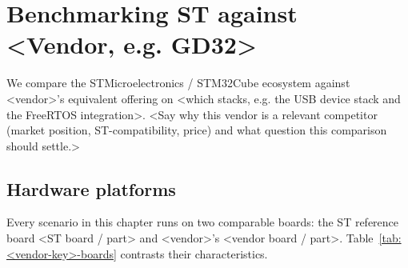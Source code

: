 %
%
%

\chapter{Benchmarking ST against <Vendor, e.g. GD32>}
\label{chap:vs-<vendor-key>}

We compare the STMicroelectronics / STM32Cube ecosystem against
<vendor>'s equivalent offering on <which stacks, e.g. the USB device stack
and the FreeRTOS integration>. <Say why this vendor is a relevant competitor
(market position, ST-compatibility, price) and what question this comparison
should settle.>

\section{Hardware platforms}
\label{sec:<vendor-key>-boards}
Every scenario in this chapter runs on two comparable boards: the ST
reference board <ST board / part> and <vendor>'s <vendor board / part>.
Table~\ref{tab:<vendor-key>-boards} contrasts their characteristics.

